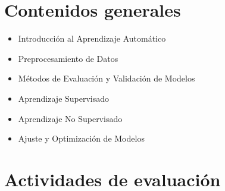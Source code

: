 \documentclass[a4,11pt]{aleph-notas}
\begin{document}
\section{Contenidos generales} 

\begin{itemize}
\item 
    Introducción al Aprendizaje Automático
\item 
    Preprocesamiento de Datos
\item 
    Métodos de Evaluación y Validación de Modelos
\item 
    Aprendizaje Supervisado
\item 
    Aprendizaje No Supervisado
\item 
    Ajuste y Optimización de Modelos
\end{itemize}

\section{Actividades de evaluación} 
\end{document}
